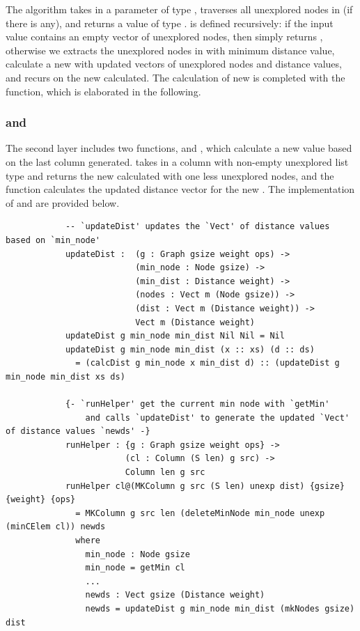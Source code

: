 The  algorithm takes in a parameter  of type , traverses all unexplored nodes in (if there is any), and returns a value of type .  is defined recursively: if the input value  contains an empty vector of unexplored nodes, then simply returns , otherwise we extracts the unexplored nodes in  with minimum distance value, calculate a new  with updated vectors of unexplored nodes and distance values, and recurs on the new  calculated. The calculation of new  is completed with the  function, which is elaborated in the following. 
\\

\subsubsection{ and } \label{second_layer}
The second layer includes two functions,  and , which calculate a new  value based on the last column generated.  takes in a column with non-empty unexplored list type and returns the new  calculated with one less unexplored nodes, and the  function calculates the updated distance vector for the new . The implementation of  and  are provided below. 
\begin{lstlisting}
			-- `updateDist' updates the `Vect' of distance values based on `min_node'
			updateDist :  (g : Graph gsize weight ops) ->
			              (min_node : Node gsize) ->
			              (min_dist : Distance weight) ->
			              (nodes : Vect m (Node gsize)) ->
			              (dist : Vect m (Distance weight)) ->
			              Vect m (Distance weight)
			updateDist g min_node min_dist Nil Nil = Nil
			updateDist g min_node min_dist (x :: xs) (d :: ds)
			  = (calcDist g min_node x min_dist d) :: (updateDist g min_node min_dist xs ds)

			{- `runHelper' get the current min node with `getMin'
				and calls `updateDist' to generate the updated `Vect' of distance values `newds' -}
			runHelper : {g : Graph gsize weight ops} ->
			            (cl : Column (S len) g src) ->
			            Column len g src
			runHelper cl@(MKColumn g src (S len) unexp dist) {gsize} {weight} {ops}
			  = MKColumn g src len (deleteMinNode min_node unexp (minCElem cl)) newds
			  where
			  	min_node : Node gsize
    			min_node = getMin cl
			   	...
			    newds : Vect gsize (Distance weight)
			    newds = updateDist g min_node min_dist (mkNodes gsize) dist
\end{lstlisting}

